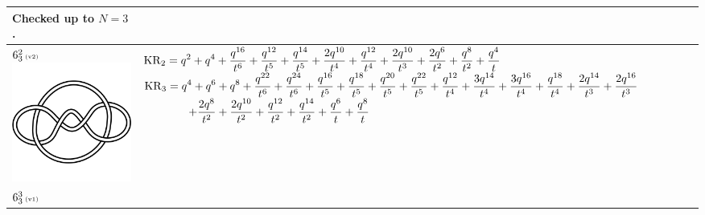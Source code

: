 \documentclass{compositio}
\theoremstyle{definition}
\numberwithin{equation}{section}
\begin{document}
{\begin{longtable}{p{}|p{}}
Checked up to $N=3$.
\\
\hline
$6_{3}^2\,\text{{\tiny (v2)}}$ 
\includegraphics[scale=0.07,angle=0]{link6_3_2.pdf} 
& 
\newline 
$
\displaystyle{%
\KR_{2} = q^2+q^4+\frac{q^{16}}{t^6}+\frac{q^{12}}{t^5}+\frac{q^{14}}{t^5}+\frac{2 q^{10}}{t^4}+\frac{q^{12}}{t^4}+\frac{2 q^{10}}{t^3}+\frac{2 q^6}{t^2}+\frac{q^8}{t^2}+\frac{q^4}{t}
}
$
\newline 
$
\displaystyle{%
\KR_{3} = q^4+q^6+q^8+\frac{q^{22}}{t^6}+\frac{q^{24}}{t^6}+\frac{q^{16}}{t^5}+\frac{q^{18}}{t^5}+\frac{q^{20}}{t^5}+\frac{q^{22}}{t^5}+\frac{q^{12}}{t^4}+\frac{3 q^{14}}{t^4}+\frac{3 q^{16}}{t^4}+\frac{q^{18}}{t^4}+\frac{2 q^{14}}{t^3}+\frac{2 q^{16}}{t^3}
}
$
\newline
$
\displaystyle{%
\qquad\qquad +\frac{2 q^8}{t^2}+\frac{2 q^{10}}{t^2}+\frac{q^{12}}{t^2}+\frac{q^{14}}{t^2}+\frac{q^6}{t}+\frac{q^8}{t}
}
$
\newline 
\\
\hline
$6_{3}^3\,\text{{\tiny (v1)}}$

\end{longtable}}
\end{document}

